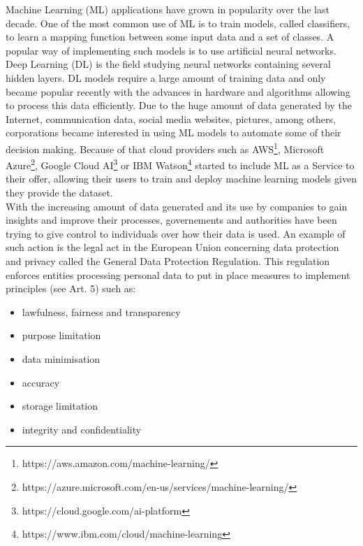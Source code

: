 \documentclass[11pt]{article}
\begin{document}
	Machine Learning (ML) applications have grown in popularity over the last decade. One of the most common use of ML is to train models, called classifiers, to learn a mapping function between some input data and a set of classes. A popular way of implementing such models is to use artificial neural networks. Deep Learning (DL) is the field studying neural networks containing several hidden layers. DL models require a large amount of training data and only became popular recently with the advances in hardware and algorithms allowing to process this data efficiently. Due to the huge amount of data generated by the Internet, communication data, social media websites, pictures, among others, corporations became interested in using ML models to automate some of their decision making. Because of that cloud providers such as AWS\footnote{https://aws.amazon.com/machine-learning/}, Microsoft Azure\footnote{https://azure.microsoft.com/en-us/services/machine-learning/}, Google Cloud AI\footnote{https://cloud.google.com/ai-platform} or IBM Watson\footnote{https://www.ibm.com/cloud/machine-learning} started to include ML as a Service to their offer, allowing their users to train and deploy machine learning models given they provide the dataset.\\
With the increasing amount of data generated and its use by companies to gain insights and improve their processes, governements and authorities have been trying to give control to individuals over how their data is used. An example of such action is the legal act in the European Union concerning data protection and privacy called the General Data Protection Regulation. This regulation enforces entities processing personal data to put in place measures to implement principles (see Art. 5) such as:
\begin{itemize}
	\item lawfulness, fairness and transparency
	\item purpose limitation
	\item data minimisation
	\item accuracy
	\item storage limitation
	\item integrity and confidentiality
\end{itemize}
\end{document}

